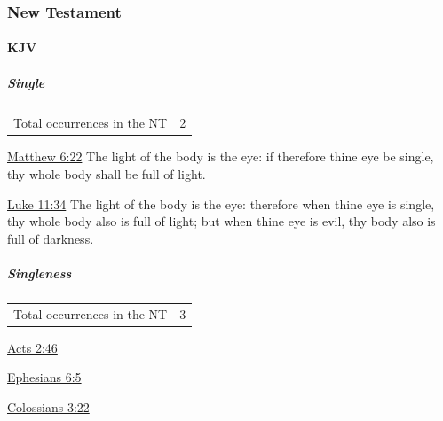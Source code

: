 			
		
		
	\subsubsection{New Testament} %
		\label{SINGLE-NT}
	
		\paragraph{KJV}
			\label{SINGLE-NT-KJV}
			
			\subparagraph{Single}
			
				\begin{tabular}{ll}
					Total occurrences in the NT & 2
				\end{tabular}
				
				\begin{compactdesc}
					\item[{\hyperref[MATTHEW-6-22]{Matthew 6:22}}] The light of the body is the eye: if therefore thine eye be single, thy whole body shall be full of light.
					\item[{\hyperref[LUKE-11-34]{Luke 11:34}}] The light of the body is the eye: therefore when thine eye is single, thy whole body also is full of light; but when thine eye is evil, thy body also is full of darkness.
				\end{compactdesc}
				
			\subparagraph{Singleness}
			
				\begin{tabular}{ll}
					Total occurrences in the NT & 3
				\end{tabular}
				
				\begin{compactdesc}
					\item[{\hyperref[ACTS-2-46]{Acts 2:46}}]
					\item[{\hyperref[EPHESIANS-6-5]{Ephesians 6:5}}]
					\item[{\hyperref[COLOSSIANS-3-22]{Colossians 3:22}}]
				\end{compactdesc}
			
